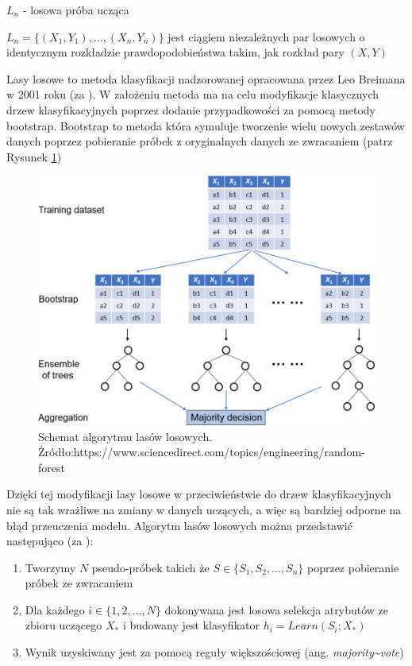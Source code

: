 \documentclass{amuthesis}
\begin{document}
\(L_n\) - losowa próba ucząca

\(L_n = \{(X_1,Y_1),\dots,(X_n,Y_n)\}\) jest ciągiem niezależnych par losowych o identycznym rozkładzie prawdopodobieństwa takim, jak rozkład pary \((X,Y)\)

Lasy losowe to metoda klasyfikacji nadzorowanej opracowana przez Leo Breimana w 2001 roku (za \textcite{perdal_zastosowanie}).
W założeniu metoda ma na celu modyfikacje klasycznych drzew klasyfikacyjnych poprzez dodanie przypadkowości za pomocą metody bootstrap.
Bootstrap to metoda która symuluje tworzenie wielu nowych zestawów danych poprzez pobieranie próbek z oryginalnych danych ze zwracaniem (patrz Rysunek \ref{fig:rycina3})

\begin{figure}[t]

{\centering \includegraphics[width=1\linewidth]{figures/forest} 

}

\caption{Schemat algorytmu lasów losowych.                       Żródło:https://www.sciencedirect.com/topics/engineering/random-forest}\label{fig:rycina3}
\end{figure}

Dzięki tej modyfikacji lasy losowe w przeciwieństwie do drzew klasyfikacyjnych nie są tak wrażliwe na zmiany w danych uczących, a więc są bardziej odporne na błąd przeuczenia modelu.
Algorytm lasów losowych można przedstawić następująco (za \textcite{grzybowska}):

\begin{enumerate}
\def\labelenumi{\arabic{enumi}.}
\tightlist
\item
  Tworzymy \(N\) pseudo-próbek takich że \(S\in\{S_1,S_2,\dots,S_n\}\) poprzez pobieranie próbek ze zwracaniem
\item
  Dla każdego \(i\in\{1,2,\dots,N\}\) dokonywana jest losowa selekcja atrybutów ze zbioru uczącego \(X_*\) i budowany jest klasyfikator \(h_i = Learn(S_i;X_*)\)
\item
  Wynik uzyskiwany jest za pomocą reguły większościowej (ang. \emph{majority\textasciitilde vote})
\end{enumerate}
\end{document}
